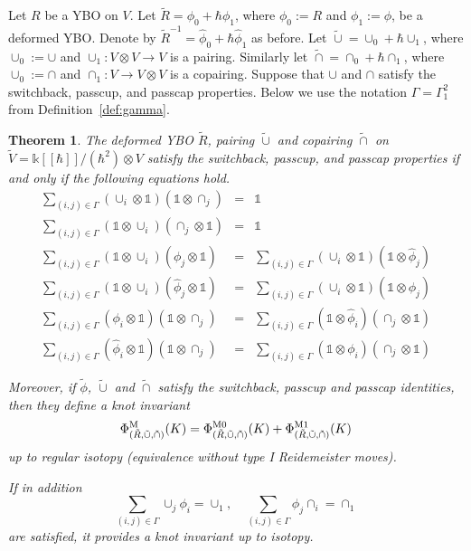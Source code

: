\documentclass[11pt,fleqn]{amsart} %
\newtheorem{theorem}{Theorem}[section]
\begin{document}
Let $R$ be a YBO on $V$.
Let $\tilde R = \phi_0 + \hbar \phi_1$, where $\phi_0 := R$ and $\phi_1 := \phi$, be a deformed YBO. 
Denote by $\tilde R^{-1} = \hat \phi_0 + \hbar \hat \phi_1$ as before.
Let 
$\tilde \cup = \cup_0 + \hbar \cup_1$, where $\cup_0 := \cup$ and $\cup_1: V \otimes V \rightarrow V$ is a pairing.
Similarly let  $\tilde \cap = \cap_0 + \hbar \cap_1$, where $\cup_0 := \cap$ and $\cap_1:  V  \rightarrow V \otimes V $ is a copairing.
Suppose that  $\cup$ and $\cap$ satisfy the switchback, passcup, and passcap properties.
Below we use the notation $\Gamma=\Gamma_1^2$ from Definition~\ref{def:gamma}. 


\begin{theorem} \label{thm:cupcap}
The deformed YBO $\tilde R$,  pairing  $\tilde \cup$ and copairing $\tilde \cap$ on $\tilde V =  \mathbb k[[\hbar]]/(\hbar^2) \otimes V $
satisfy the switchback, passcup, and passcap properties if 
and only if the following equations hold.
\begin{eqnarray}
\sum_{(i,j) \in \Gamma} (\cup_i \otimes {\mathbb 1}) ( {\mathbb 1} \otimes \cap_j) 
&=&  {\mathbb 1} \label{switch1} \\
\sum_{(i,j) \in \Gamma} ( {\mathbb 1} \otimes \cup_i)  (\cap_j \otimes {\mathbb 1}) 
&=&  {\mathbb 1} \label{switch2} \\
\sum_{(i,j) \in \Gamma} ( {\mathbb 1} \otimes \cup_i) (\phi_j \otimes  {\mathbb 1} )
&=& \sum_{(i,j) \in \Gamma} (\cup_i \otimes {\mathbb 1}) ( {\mathbb 1} \otimes \hat \phi_j ) \label{passcup1} \\
\sum_{(i,j) \in \Gamma} ( {\mathbb 1} \otimes \cup_i) ( \hat \phi_j \otimes  {\mathbb 1} )
&=& \sum_{(i,j) \in \Gamma} (\cup_i \otimes {\mathbb 1}) ( {\mathbb 1} \otimes  \phi_j ) \label{passcup2} \\
\sum_{(i,j) \in \Gamma} (\phi_i \otimes {\mathbb 1} ) ( {\mathbb 1} \otimes \cap_j) 
&=& \sum_{(i,j) \in \Gamma}( {\mathbb 1} \otimes \hat \phi_i) (\cap_j \otimes {\mathbb 1} )  \label{passcap1} \\
\sum_{(i,j) \in \Gamma} (\hat \phi_i \otimes {\mathbb 1} ) ( {\mathbb 1} \otimes \cap_j) 
&=& \sum_{(i,j) \in \Gamma}( {\mathbb 1} \otimes  \phi_i) (\cap_j \otimes {\mathbb 1} )  \label{passcap2}
\end{eqnarray}

Moreover, if 
$\tilde \phi$, $\tilde \cup$ and $\tilde \cap$ 
satisfy the switchback, passcup and passcap identities, then they 
define  a knot invariant 
 $$\Phi^{\rm M}_{(\tilde R, \tilde \cup, \tilde \cap)}(K) = \Phi^{{\rm M} 0}_{(\tilde R, \tilde \cup, \tilde \cap)}(K) + \Phi^{{\rm M} 1}_{(\tilde R, \tilde \cup, \tilde \cap)}(K)$$ up to regular isotopy
(equivalence without type I Reidemeister moves).


If in addition 
$$ \sum_{(i,j) \in \Gamma}\cup_j  \phi_i =  \cup_1, \quad  \sum_{(i,j) \in \Gamma} \phi_j \cap_i =  \cap_1 $$
are satisfied, it provides a knot invariant up to isotopy.
\end{theorem}
\end{document}
